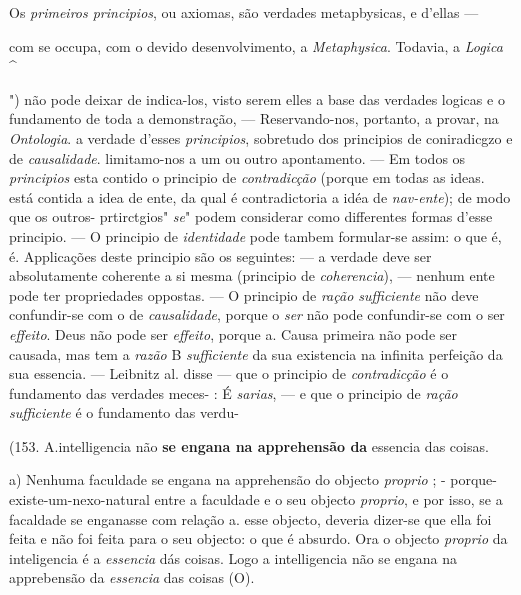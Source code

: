 Os \emph{primeiros principios}, ou axiomas, são verdades metapbysicas, e d'ellas ---

com se occupa, com o devido desenvolvimento, a \emph{Metaphysica}. Todavia, a \emph{Logica} \textasciicircum{}

") não pode deixar de indica-los, visto serem elles a base das verdades logicas e o fundamento de toda a demonstração, --- Reservando-nos, portanto, a provar, na \emph{Ontologia}. a verdade d'esses \emph{principios}, sobretudo dos principios de coniradicgzo e de \emph{causalidade}. limitamo-nos a um ou outro apontamento. --- Em todos os \emph{principios} esta contido o principio de \emph{contradicção} (porque em todas as ideas. está contida a idea de ente, da qual é contradictoria a idéa de \emph{nav-ente}); de modo que os outros- prtirctgios" \emph{se}" podem considerar como differentes formas d'esse principio. --- O principio de \emph{identidade} pode tambem formular-se assim: o que é, é. Applicações deste principio são os seguintes: --- a verdade deve ser absolutamente coherente a si mesma (principio de \emph{coherencia}), --- nenhum ente pode ter propriedades oppostas. --- O principio de \emph{ração sufficiente} não deve confundir-se com o de \emph{causalidade}, porque o \emph{ser} não pode confundir-se com o ser \emph{effeito}. Deus não pode ser \emph{effeito}, porque a. Causa primeira não pode ser causada, mas tem a \emph{razão} B \emph{sufficiente} da sua existencia na infinita perfeição da sua essencia. --- Leibnitz al. disse --- que o principio de \emph{contradicção} é o fundamento das verdades meces- : É \emph{sarias}, --- e que o principio de \emph{ração sufficiente} é o fundamento das verdu-

(153. A.intelligencia não \textbf{se engana na apprehensão da} essencia das coisas.

a) Nenhuma faculdade se engana na apprehensão do objecto \emph{proprio} ; - porque-existe-um-nexo-natural entre a faculdade e o seu objecto \emph{proprio}, e por isso, se a facaldade se enganasse com relação a. esse objecto, deveria dizer-se que ella foi feita e não foi feita para o seu objecto: o que é absurdo. Ora o objecto \emph{proprio} da inteligencia é a \emph{essencia} dás coisas. Logo a intelligencia não se engana na apprebensão da \emph{essencia} das coisas (O).

